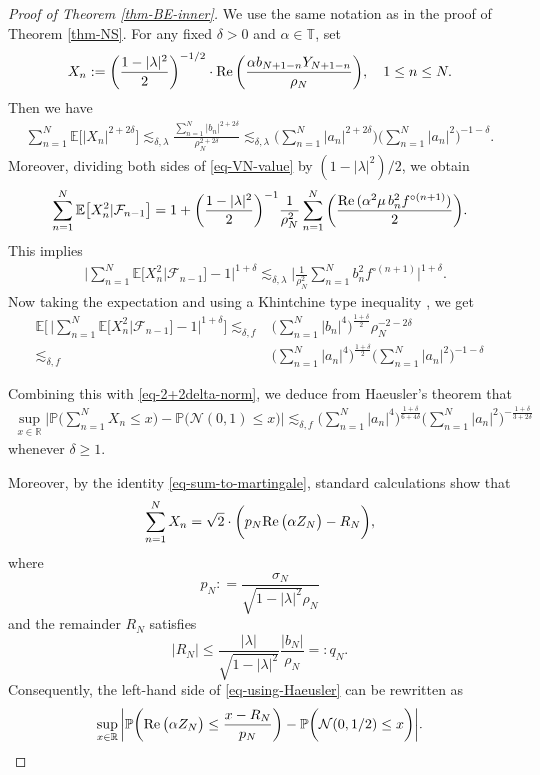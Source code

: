 \documentclass[11pt, reqno]{amsart}
\theoremstyle{definition}
\newtheorem*{Brown-Eagleson Theorem}{The Brown-Eagleson Theorem}
\newcommand{\R}{\mathbb R}
\newcommand{\T}{\mathbb T}
\newcommand{\E}{\mathbb E}
\newcommand{\PP}{\mathbb P}
\newcommand{\cal}{\mathcal}
\begin{document}
\begin{proof}[Proof of Theorem \ref{thm-BE-inner}]
We use the same notation as in the proof of Theorem \ref{thm-NS}. For any fixed $\delta>0$ and $\alpha\in \T$, set 
$$X_n:= \bigg(\frac{1-|\lambda|^2}{2}\bigg)^{-1/2} \cdot {\rm Re}\, \bigg( \frac{\alpha b_{N+1-n} Y_{N+1-n}}{\rho_N}\bigg), \quad 1\leq n \leq N.$$ Then we have
\begin{align}\label{eq-2+2delta-norm}
	\sum_{n=1}^N \E\big[ |X_n|^{2+2\delta}\big]\lesssim_{\delta,\lambda} \frac{\sum_{n=1}^N |b_n|^{2+2\delta}}{\rho_N^{2+2\delta}}
	\lesssim_{\delta,\lambda} \bigg( \sum_{n=1}^N |a_n|^{2+2\delta}\bigg) \bigg( \sum_{n=1}^N |a_n|^2\bigg)^{-1-\delta}.
\end{align}
Moreover, dividing both sides of \eqref{eq-VN-value} by $(1-|\lambda|^2)/2$, we obtain
\begin{align*} 
	\sum_{n=1}^N \E\big[ X_n^2 | \cal F_{n-1}\big]= 1+ \bigg(\frac{1-|\lambda|^2}{2}\bigg)^{-1} \frac{1}{\rho^2_N} \sum_{n=1}^N \bigg(\frac{{\rm Re}\,(\alpha^2 \mu \,b_n^2f^{\circ (n+1)})}{2}\bigg).
\end{align*}
This implies 
\begin{align*}
	&\bigg|\sum_{n=1}^N \E\big[ X_n^2 | \cal F_{n-1}\big] -1\bigg|^{1+\delta}\lesssim_{\delta,\lambda} \bigg| \frac{1}{\rho_N^2}\sum_{n=1}^N b_n^2 f^{\circ (n+1)}\bigg|^{1+\delta}.
\end{align*}
Now taking the expectation and using a Khintchine type inequality \cite[Corollary 1.4]{Nic22}, we get
\begin{align*} 
	\E\bigg[\, \bigg|\sum_{n=1}^N \E\big[ X_n^2 | \cal F_{n-1}\big] -1\bigg|^{1+\delta}\bigg] \lesssim_{\delta,f}& \bigg(\sum_{n=1}^N |b_n|^4 \bigg)^{\frac{1+\delta}{2}} \rho_N^{-2-2\delta} \\ 
	\lesssim_{\delta,f} &\bigg( \sum_{n=1}^N |a_n|^4\bigg)^{\frac{1+\delta}{2}}\bigg( \sum_{n=1}^N |a_n|^2\bigg)^{-1-\delta}
\end{align*}

Combining this with \eqref{eq-2+2delta-norm}, we deduce from Haeusler's theorem that
\begin{align}\label{eq-using-Haeusler}
\sup_{x\in \R}\bigg| \PP\Big( \sum_{n=1}^N X_n\leq x \Big) - \PP \Big(\cal N(0,1) \leq x \Big)\bigg| 
\lesssim_{\delta,f} \bigg(\sum_{n=1}^N |a_n|^{4} \bigg)^{\frac{1+\delta}{6+4\delta}}  \bigg(\sum_{n=1}^N |a_n|^{2} \bigg)^{-\frac{1+\delta}{3+2\delta}}
\end{align} whenever $\delta\geq 1$.


Moreover, by the identity \eqref{eq-sum-to-martingale}, standard calculations show that
\begin{align*} 
	\sum_{n=1}^N X_n = \sqrt{2} \cdot \bigg( p_N {\rm Re}\,\big( \alpha Z_N \big)- R_N\bigg),
\end{align*}
where $$p_N: =\frac{\sigma_N}{{\sqrt{1-|\lambda|^2}\rho_N}}$$ and the remainder $R_N$ satisfies $$|R_N| \leq \frac{|\lambda|}{\sqrt{1-|\lambda|^2}} \frac{|b_N|}{\rho_N} =: q_N.$$ Consequently, the left-hand side of \eqref{eq-using-Haeusler} can be rewritten as
$$\sup_{x\in \R} \bigg| \PP\bigg( {\rm Re}\, \big( \alpha Z_N\big)\leq \frac{x-R_N}{p_N} \bigg) - \PP\bigg( \cal N(0,1/2) \leq x \bigg)\bigg|.$$


\end{proof}
\end{document}
